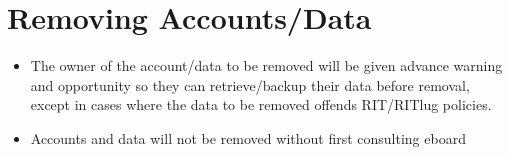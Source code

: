 \documentclass[a4paper]{article}
\begin{document}
\section{Removing Accounts/Data}
\begin{itemize}
\item The owner of the account/data to be removed will be given advance warning and opportunity so they can retrieve/backup their data before removal, except in cases where the data to be removed offends RIT/RITlug policies.
\item Accounts and data will not be removed without first consulting eboard
\end{itemize}
\end{document}
